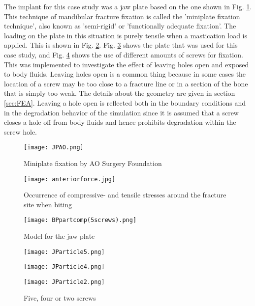 The implant for this case study was a jaw plate based on the one shown in Fig. \ref{fig:JPAO}. This technique of mandibular fracture fixation is called the 'miniplate fixation technique', also known as 'semi-rigid' or 'functionally adequate fixation'. The loading on the plate in this situation is purely tensile when a mastication load is applied. This is shown in Fig. \ref{fig:anteriorforce}. Fig. \ref{fig:BPpart} shows the plate that was used for this case study, and Fig. \ref{fig:JPscrews} shows the use of different amounts of screws for fixation. This was implemented to investigate the effect of leaving holes open and exposed to body fluids. Leaving holes open is a common thing because in some cases the location of a screw may be too close to a fracture line or in a section of the bone that is simply too weak. The details about the geometry are given in section \ref{sec:FEA}. Leaving a hole open is reflected both in the boundary conditions and in the degradation behavior of the simulation since it is assumed that a screw closes a hole off from body fluids and hence prohibits degradation within the screw hole.

\begin{figure}[h]
    \centering
    \texttt{[image: JPAO.png]}
    \caption{Miniplate fixation by AO Surgery Foundation \cite{JPAO}}
    \label{fig:JPAO}
\end{figure}

\begin{figure}[h]
    \centering
    \texttt{[image: anteriorforce.jpg]}
    \caption{Occurrence of compressive- and tensile stresses around the fracture site when biting \cite{Bohluli}}
    \label{fig:anteriorforce}
\end{figure}

\begin{figure}[h]
    \centering
    \texttt{[image: BPpartcomp(5screws).png]}
    \caption{Model for the jaw plate}
    \label{fig:BPpart}
\end{figure}

\begin{figure}[h]
  \centering
  \begin{minipage}[b]{0.51\textwidth}
    \texttt{[image: JParticle5.png]}
    \captionsetup{labelformat=empty}
  \end{minipage}
  \hfill
  \begin{minipage}[b]{0.51\textwidth}
    \texttt{[image: JParticle4.png]}
    \captionsetup{labelformat=empty}
  \end{minipage}
  \hfill
  \begin{minipage}[b]{0.51\textwidth}
    \texttt{[image: JParticle2.png]}
    \captionsetup{labelformat=empty}
  \end{minipage}
  \caption{Five, four or two screws}
  \label{fig:JPscrews}
\end{figure}


